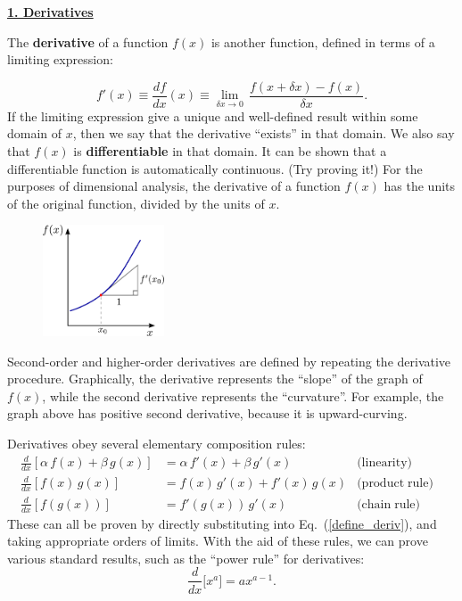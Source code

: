 \documentclass[10pt,a4paper]{article}
\begin{document}
\setcounter{page}{7}
\noindent
\underline{\textbf{\LARGE 1. Derivatives}}
\vskip 0.1in

The \textbf{derivative} of a function $f(x)$ is another function,
defined in terms of a limiting expression:

\begin{equation}
f'(x) \equiv \frac{df}{dx}(x) \equiv \lim_{\delta x \rightarrow 0} \, \frac{f(x + \delta x) - f(x)}{\delta x}.
\label{define_deriv}
\end{equation}
If the limiting expression give a unique and well-defined result
within some domain of $x$, then we say that the derivative ``exists''
in that domain. We also say that $f(x)$ is \textbf{differentiable} in
that domain. It can be shown that a differentiable function is
automatically continuous.  (Try proving it!) For the purposes of
dimensional analysis, the derivative of a function $f(x)$ has the
units of the original function, divided by the units of $x$.

\begin{figure}[h]
  \centering\includegraphics[width=0.32\textwidth]{derivative}
\end{figure}
    
Second-order and higher-order derivatives are defined by repeating the
derivative procedure. Graphically, the derivative represents the
``slope'' of the graph of $f(x)$, while the second derivative
represents the ``curvature''. For example, the graph above has
positive second derivative, because it is upward-curving.

 Derivatives obey several elementary composition rules:
\begin{align}
\frac{d}{dx}\left[\alpha\, f(x) + \beta\, g(x)\right] &= \alpha\, f'(x) + \beta\, g'(x) \quad &\textrm{(linearity)}& \\   \frac{d}{dx}\left[f(x) \, g(x)\right] &= f(x) \, g'(x) + f'(x) \, g(x) &\textrm{(product}\;\textrm{rule)}& \\   \frac{d}{dx}\left[f(g(x))\right] &= f'(g(x)) \, g'(x) &\textrm{(chain}\;\textrm{rule)}&
\end{align}
These can all be proven by directly substituting into
Eq.~(\ref{define_deriv}), and taking appropriate orders of
limits. With the aid of these rules, we can prove various standard
results, such as the ``power rule'' for derivatives:
\begin{equation*}
  \frac{d}{dx} \big[x^a\big] = a x^{a-1}.
\end{equation*}
\end{document}
